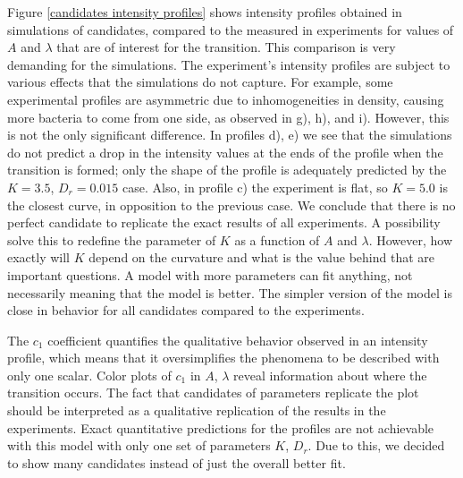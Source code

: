 Figure \ref{candidates intensity profiles} shows intensity profiles obtained in simulations of candidates, compared to the measured in experiments for values of $A$ and $\lambda$ that are of interest for the transition. This comparison is very demanding for the simulations. The experiment's intensity profiles are subject to various effects that the simulations do not capture. For example, some experimental profiles are asymmetric due to inhomogeneities in density, causing more bacteria to come from one side, as observed in g), h), and i). However, this is not the only significant difference. In profiles d), e) we see that the simulations do not predict a drop in the intensity values at the ends of the profile when the transition is formed; only the shape of the profile is adequately predicted by the $K=3.5$, $D_r=0.015$ case. Also, in profile c) the experiment is flat, so $K=5.0$ is the closest curve, in opposition to the previous case. We conclude that there is no perfect candidate to replicate the exact results of all experiments. A possibility solve this to redefine the parameter of $K$ as a function of $A$ and $\lambda$. However, how exactly will $K$ depend on the curvature and what is the value behind that are important questions. A model with more parameters can fit anything, not necessarily meaning that the model is better. The simpler version of the model is close in behavior for all candidates compared to the experiments. 

The $c_1$ coefficient quantifies the qualitative behavior observed in an intensity profile, which means that it oversimplifies the phenomena to be described with only one scalar. Color plots of $c_1$ in $A$, $\lambda$ reveal information about where the transition occurs. The fact that candidates of parameters replicate the plot should be interpreted as a qualitative replication of the results in the experiments. Exact quantitative predictions for the profiles are not achievable with this model with only one set of parameters $K$, $D_r$. Due to this, we decided to show many candidates instead of just the overall better fit.


